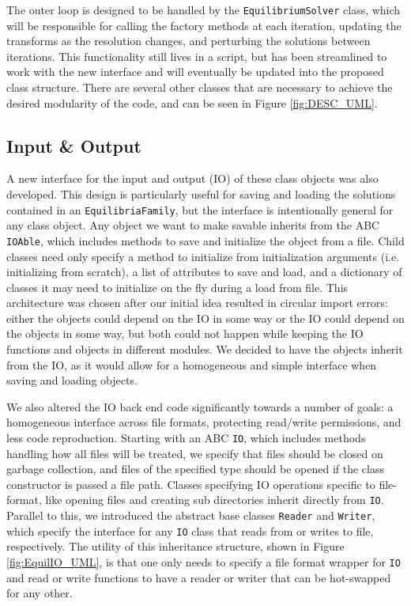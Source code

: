 \documentclass{article}
\begin{document}
The outer loop is designed to be handled by the \texttt{EquilibriumSolver} class, which will be responsible for calling the factory methods at each iteration, updating the transforms as the resolution changes, and perturbing the solutions between iterations.
This functionality still lives in a script, but has been streamlined to work with the new interface and will eventually be updated into the proposed class structure.
There are several other classes that are necessary to achieve the desired modularity of the code, and can be seen in Figure \ref{fig:DESC_UML}.

\subsection{Input \& Output}

A new interface for the input and output (IO) of these class objects was also developed.
This design is particularly useful for saving and loading the solutions contained in an \texttt{EquilibriaFamily}, but the interface is intentionally general for any class object.
Any object we want to make savable inherits from the ABC \texttt{IOAble}, which includes methods to save and initialize the object from a file.
Child classes need only specify a method to initialize from initialization arguments (i.e. initializing from scratch), a list of attributes to save and load, and a dictionary of classes it may need to initialize on the fly during a load from file.
This architecture was chosen after our initial idea resulted in circular import errors:
either the objects could depend on the IO in some way or the IO could depend on the objects in some way, but both could not happen while keeping the IO functions and objects in different modules.
We decided to have the objects inherit from the IO, as it would allow for a homogeneous and simple interface when saving and loading objects.

We also altered the IO back end code significantly towards a number of goals: a homogeneous interface across file formats, protecting read/write permissions, and less code reproduction.
Starting with an ABC \texttt{IO}, which includes methods handling how all files will be treated, we specify that files should be closed on garbage collection, and files of the specified type should be opened if the class constructor is passed a file path.
Classes specifying IO operations specific to file-format, like opening files and creating sub directories inherit directly from \texttt{IO}.
Parallel to this, we introduced the abstract base classes \texttt{Reader} and \texttt{Writer}, which specify the interface for any \texttt{IO} class that reads from or writes to file, respectively.
The utility of this inheritance structure, shown in Figure \ref{fig:EquilIO_UML}, is that one only needs to specify a file format wrapper for \texttt{IO} and read or write functions to have a reader or writer that can be hot-swapped for any other.
\end{document}
